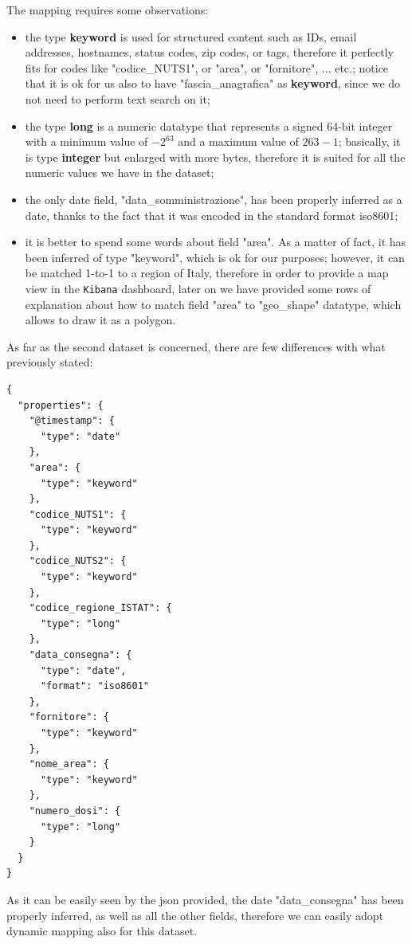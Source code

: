 \documentclass{article}
\begin{document}
The mapping requires some observations:
\begin{itemize}
    \item the type \textbf{keyword} is used for structured content such as IDs, email addresses, hostnames, status codes, zip codes, or tags, therefore it perfectly fits for codes like "codice\_NUTS1", or "area", or "fornitore", ... etc.; notice that it is ok for us also to have "fascia\_anagrafica" as \textbf{keyword}, since we do not need to perform text search on it;
    \item the type \textbf{long} is a numeric datatype that represents a signed 64-bit integer with a minimum value of $-2^{63}$ and a maximum value of $2{63}-1$; basically, it is type \textbf{integer} but enlarged with more bytes, therefore it is suited for all the numeric values we have in the dataset;
    \item the only date field, "data\_somministrazione", has been properly inferred as a date, thanks to the fact that it was encoded in the standard format iso8601;
    \item it is better to spend some words about field "area". As a matter of fact, it has been inferred of type "keyword", which is ok for our purposes; however, it can be matched 1-to-1 to a region of Italy, therefore in order to provide a map view in the \verb|Kibana| dashboard, later on we have provided some rows of explanation about how to match field "area" to "geo\_shape" datatype, which allows to draw it as a polygon.
\end{itemize}

As far as the second dataset is concerned, there are few differences with what previously stated:
\begin{verbatim}
{
  "properties": {
    "@timestamp": {
      "type": "date"
    },
    "area": {
      "type": "keyword"
    },
    "codice_NUTS1": {
      "type": "keyword"
    },
    "codice_NUTS2": {
      "type": "keyword"
    },
    "codice_regione_ISTAT": {
      "type": "long"
    },
    "data_consegna": {
      "type": "date",
      "format": "iso8601"
    },
    "fornitore": {
      "type": "keyword"
    },
    "nome_area": {
      "type": "keyword"
    },
    "numero_dosi": {
      "type": "long"
    }
  }
}
\end{verbatim}
As it can be easily seen by the json provided, the date "data\_consegna" has been properly inferred, as well as all the other fields, therefore we can easily adopt dynamic mapping also for this dataset.
\newpage
\end{document}
